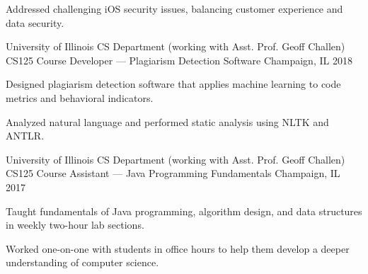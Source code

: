 \begin{cventries}
{\begin{cvitems}
		\item {Addressed challenging iOS security issues, balancing customer experience and data security.}
	\end{cvitems}
}
\cventry
{University of Illinois CS Department (working with Asst. Prof. Geoff Challen)} %
{CS125 Course Developer — Plagiarism Detection Software} %
{Champaign, IL} %
{2018} %
{
	\begin{cvitems} %
		\item {Designed plagiarism detection software that applies machine learning to code metrics and behavioral indicators.}
		\item {Analyzed natural language and performed static analysis using NLTK and ANTLR.}
	\end{cvitems}
}
\cventry
{University of Illinois CS Department (working with Asst. Prof. Geoff Challen)} %
{CS125 Course Assistant — Java Programming Fundamentals} %
{Champaign, IL} %
{2017} %
{
	\begin{cvitems} %
	\item {Taught fundamentals of Java programming, algorithm design, and data structures in weekly two-hour lab sections.}
		\item {Worked one-on-one with students in office hours to help them develop a deeper understanding of computer science.}
	\end{cvitems}
}
\end{cventries}
